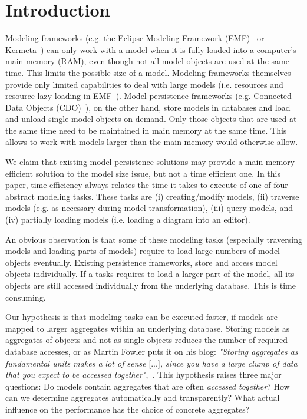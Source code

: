 \section{Introduction}

Modeling frameworks (e.g. the Eclipse Modeling Framework (EMF)~\cite{emf2009} or Kermeta~\cite{kermeta}) can only work with a model when it is fully loaded into a computer's main memory (RAM), even though not all model objects are used at the same time.
This limits the possible size of a model. 
Modeling frameworks themselves provide only limited capabilities to deal with large models (i.e. resources and resource lazy loading in EMF~\cite{emf2009}). 
Model persistence frameworks (e.g. Connected Data Objects (CDO)~\cite{cdo}), on the other hand, store models in databases and load and unload single model objects on demand. 
Only those objects that are used at the same time need to be maintained in main memory at the same time. This allows to work with models larger than the main memory would otherwise allow. 

We claim that existing model persistence solutions may provide a main memory efficient solution to the model size issue, but not a time efficient one. In this paper, time efficiency always relates the time it takes to execute of one of four abstract modeling tasks. These tasks are (i) creating/modify models, (ii) traverse models (e.g. as necessary during model transformation), (iii) query models, and (iv) partially loading models (i.e. loading a diagram into an editor).

An obvious observation is that some of these modeling tasks (especially traversing models and loading parts of models) require to load large numbers of model objects eventually. Existing persistence frameworks, store and access model objects individually. If a tasks requires to load a larger part of the model, all its objects are still accessed individually from the underlying database. This is time consuming.

Our hypothesis is that modeling tasks can be executed faster, if models are mapped to larger aggregates within an underlying database. Storing models as aggregates of objects and not as single objects reduces the number of required database accesses, or as Martin Fowler puts it on his blog: \emph{"Storing aggregates as fundamental units makes a lot of sense} [...]\emph{, since you have a large clump of data that you expect to be accessed together"},~\cite{martinFowler}. This hypothesis raises three major questions: Do models contain aggregates that are often \emph{accessed together}? How can we determine aggregates automatically and transparently? What actual influence on the performance has the choice of concrete aggregates?

